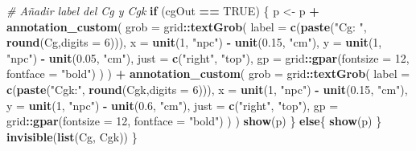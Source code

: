 \documentclass[
]{book}
\newenvironment{Shaded}{\begin{snugshade}}{\end{snugshade}}
\newcommand{\AttributeTok}[1]{\textcolor[rgb]{0.13,0.29,0.53}{#1}}
\newcommand{\CommentTok}[1]{\textcolor[rgb]{0.56,0.35,0.01}{\textit{#1}}}
\newcommand{\ConstantTok}[1]{\textcolor[rgb]{0.56,0.35,0.01}{#1}}
\newcommand{\ControlFlowTok}[1]{\textcolor[rgb]{0.13,0.29,0.53}{\textbf{#1}}}
\newcommand{\DecValTok}[1]{\textcolor[rgb]{0.00,0.00,0.81}{#1}}
\newcommand{\FloatTok}[1]{\textcolor[rgb]{0.00,0.00,0.81}{#1}}
\newcommand{\FunctionTok}[1]{\textcolor[rgb]{0.13,0.29,0.53}{\textbf{#1}}}
\newcommand{\NormalTok}[1]{#1}
\newcommand{\OtherTok}[1]{\textcolor[rgb]{0.56,0.35,0.01}{#1}}
\newcommand{\SpecialCharTok}[1]{\textcolor[rgb]{0.81,0.36,0.00}{\textbf{#1}}}
\newcommand{\StringTok}[1]{\textcolor[rgb]{0.31,0.60,0.02}{#1}}
\begin{document}
\begin{Shaded}
\begin{Highlighting}[]
  \CommentTok{\# Añadir label del Cg y Cgk}
  \ControlFlowTok{if}\NormalTok{ (cgOut }\SpecialCharTok{==} \ConstantTok{TRUE}\NormalTok{) \{}
\NormalTok{    p }\OtherTok{\textless{}{-}}\NormalTok{ p }\SpecialCharTok{+}
      \FunctionTok{annotation\_custom}\NormalTok{(}
        \AttributeTok{grob =}\NormalTok{ grid}\SpecialCharTok{::}\FunctionTok{textGrob}\NormalTok{(}
          \AttributeTok{label =} \FunctionTok{c}\NormalTok{(}\FunctionTok{paste}\NormalTok{(}\StringTok{"Cg: "}\NormalTok{, }\FunctionTok{round}\NormalTok{(Cg,}\AttributeTok{digits =} \DecValTok{6}\NormalTok{))),}
          \AttributeTok{x =} \FunctionTok{unit}\NormalTok{(}\DecValTok{1}\NormalTok{, }\StringTok{"npc"}\NormalTok{) }\SpecialCharTok{{-}} \FunctionTok{unit}\NormalTok{(}\FloatTok{0.15}\NormalTok{, }\StringTok{"cm"}\NormalTok{),}
          \AttributeTok{y =} \FunctionTok{unit}\NormalTok{(}\DecValTok{1}\NormalTok{, }\StringTok{"npc"}\NormalTok{) }\SpecialCharTok{{-}} \FunctionTok{unit}\NormalTok{(}\FloatTok{0.05}\NormalTok{, }\StringTok{"cm"}\NormalTok{),}
          \AttributeTok{just =} \FunctionTok{c}\NormalTok{(}\StringTok{"right"}\NormalTok{, }\StringTok{"top"}\NormalTok{),}
          \AttributeTok{gp =}\NormalTok{ grid}\SpecialCharTok{::}\FunctionTok{gpar}\NormalTok{(}\AttributeTok{fontsize =} \DecValTok{12}\NormalTok{, }\AttributeTok{fontface =} \StringTok{"bold"}\NormalTok{)}
\NormalTok{        )}
\NormalTok{      ) }\SpecialCharTok{+} 
      \FunctionTok{annotation\_custom}\NormalTok{(}
        \AttributeTok{grob =}\NormalTok{ grid}\SpecialCharTok{::}\FunctionTok{textGrob}\NormalTok{(}
          \AttributeTok{label =} \FunctionTok{c}\NormalTok{(}\FunctionTok{paste}\NormalTok{(}\StringTok{"Cgk:"}\NormalTok{, }\FunctionTok{round}\NormalTok{(Cgk,}\AttributeTok{digits =} \DecValTok{6}\NormalTok{))),}
          \AttributeTok{x =} \FunctionTok{unit}\NormalTok{(}\DecValTok{1}\NormalTok{, }\StringTok{"npc"}\NormalTok{) }\SpecialCharTok{{-}} \FunctionTok{unit}\NormalTok{(}\FloatTok{0.15}\NormalTok{, }\StringTok{"cm"}\NormalTok{),}
          \AttributeTok{y =} \FunctionTok{unit}\NormalTok{(}\DecValTok{1}\NormalTok{, }\StringTok{"npc"}\NormalTok{) }\SpecialCharTok{{-}} \FunctionTok{unit}\NormalTok{(}\FloatTok{0.6}\NormalTok{, }\StringTok{"cm"}\NormalTok{),}
          \AttributeTok{just =} \FunctionTok{c}\NormalTok{(}\StringTok{"right"}\NormalTok{, }\StringTok{"top"}\NormalTok{),}
          \AttributeTok{gp =}\NormalTok{ grid}\SpecialCharTok{::}\FunctionTok{gpar}\NormalTok{(}\AttributeTok{fontsize =} \DecValTok{12}\NormalTok{, }\AttributeTok{fontface =} \StringTok{"bold"}\NormalTok{)}
\NormalTok{        )}
\NormalTok{      )}
    \FunctionTok{show}\NormalTok{(p)}
\NormalTok{  \}}
  \ControlFlowTok{else}\NormalTok{\{}
    \FunctionTok{show}\NormalTok{(p)}
\NormalTok{  \}}
  \FunctionTok{invisible}\NormalTok{(}\FunctionTok{list}\NormalTok{(Cg, Cgk))}
\NormalTok{\}}
\end{Highlighting}
\end{Shaded}
\end{document}
